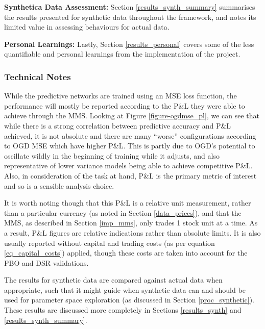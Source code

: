 \documentclass[a4paper,11pt,oneside]{article}
\theoremstyle{plain}
\theoremstyle{definition}
\begin{document}
	\textbf{Synthetica Data Assessment:} Section \ref{results_synth_summary} summarises the results presented for synthetic data throughout the framework, and notes its limited value in assessing behaviours for actual data. \newline 
	
	\textbf{Personal Learnings:} Lastly, Section \ref{results_personal} covers some of the less quantifiable and personal learnings from the implementation of the project.
	
	\subsubsection{Technical Notes}
	
	While the predictive networks are trained using an MSE loss function, the performance will mostly be reported according to the P\&L they were able to achieve through the MMS. Looking at Figure \ref{figure-ogdmse_pl}, we can see that while there is a strong correlation between predictive accuracy and P\&L achieved, it is not absolute and there are many ``worse'' configurations according to OGD MSE which have higher P\&L. This is partly due to OGD's potential to oscillate wildly in the beginning of training while it adjusts, and also representative of lower variance models being able to achieve competitive P\&L. Also, in consideration of the task at hand, P\&L is the primary metric of interest and so is a sensible analysis choice. \newline
	
	It is worth noting though that this P\&L is a relative unit measurement, rather than a particular currency (as noted in Section \ref{data_prices}), and that the MMS, as described in Section \ref{imp_mms}, only trades 1 stock unit at a time. As a result, P\&L figures are relative indications rather than absolute limits. It is also usually reported without capital and trading costs (as per equation \eqref{eq_capital_costs}) applied, though these costs are taken into account for the PBO and DSR validations. \newline

	The results for synthetic data are compared against actual data when appropriate, such that it might guide when synthetic data can and should be used for parameter space exploration (as discussed in Section \ref{proc_synthetic}). These results are discussed more completely in Sections \ref{results_synth} and \ref{results_synth_summary}.\newline
\end{document}
